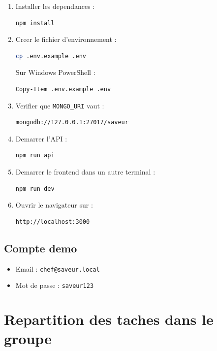 \documentclass[12pt,a4paper]{report}
\begin{document}
\begin{enumerate}[leftmargin=*]
  \item Installer les dependances :
  \begin{lstlisting}[language=bash]
npm install
  \end{lstlisting}
  \item Creer le fichier d'environnement :
  \begin{lstlisting}[language=bash]
cp .env.example .env
  \end{lstlisting}
  Sur Windows PowerShell :
  \begin{lstlisting}[language=bash]
Copy-Item .env.example .env
  \end{lstlisting}
  \item Verifier que \texttt{MONGO\_URI} vaut :
  \begin{lstlisting}[language=bash]
mongodb://127.0.0.1:27017/saveur
  \end{lstlisting}
  \item Demarrer l'API :
  \begin{lstlisting}[language=bash]
npm run api
  \end{lstlisting}
  \item Demarrer le frontend dans un autre terminal :
  \begin{lstlisting}[language=bash]
npm run dev
  \end{lstlisting}
  \item Ouvrir le navigateur sur :
  \begin{lstlisting}[language=bash]
http://localhost:3000
  \end{lstlisting}
\end{enumerate}

\section*{Compte demo}

\begin{itemize}[leftmargin=*]
  \item Email : \texttt{chef@saveur.local}
  \item Mot de passe : \texttt{saveur123}
\end{itemize}

\setcounter{chapter}{3}
\chapter{Repartition des taches dans le groupe}
\end{document}
